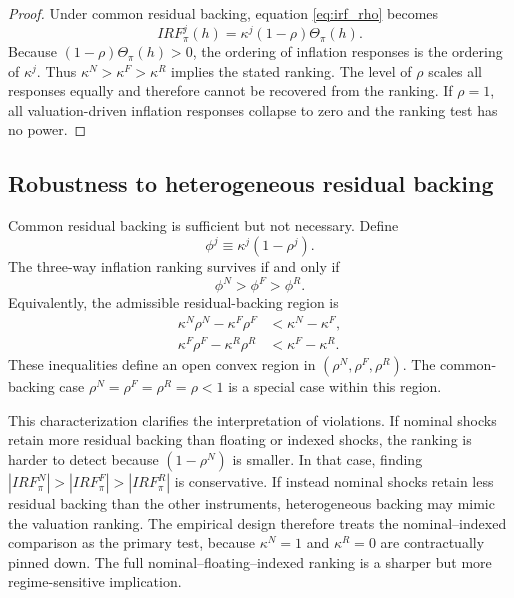 \documentclass[12pt,a4paper]{article}
\begin{document}
\begin{proof}
Under common residual backing, equation \eqref{eq:irf_rho} becomes
\[
IRF_{\pi}^{j}(h)=\kappa^j(1-\rho)\Theta_{\pi}(h).
\]
Because \((1-\rho)\Theta_{\pi}(h)>0\), the ordering of inflation responses is the ordering of \(\kappa^j\). Thus \(\kappa^N>\kappa^F>\kappa^R\) implies the stated ranking. The level of \(\rho\) scales all responses equally and therefore cannot be recovered from the ranking. If \(\rho=1\), all valuation-driven inflation responses collapse to zero and the ranking test has no power.\end{proof}

\subsection{Robustness to heterogeneous residual backing}

Common residual backing is sufficient but not necessary. Define
\begin{equation}
\phi^j \equiv \kappa^j(1-\rho^j).
\end{equation}
The three-way inflation ranking survives if and only if
\begin{equation}
\phi^N>\phi^F>\phi^R.
\end{equation}
Equivalently, the admissible residual-backing region is
\begin{align}
\kappa^N\rho^N-\kappa^F\rho^F &< \kappa^N-\kappa^F,
\label{eq:region_nf}\\
\kappa^F\rho^F-\kappa^R\rho^R &< \kappa^F-\kappa^R.
\label{eq:region_fr}
\end{align}
These inequalities define an open convex region in \((\rho^N,\rho^F,\rho^R)\). The common-backing case \(\rho^N=\rho^F=\rho^R=\rho<1\) is a special case within this region.

This characterization clarifies the interpretation of violations. If nominal shocks retain more residual backing than floating or indexed shocks, the ranking is harder to detect because \((1-\rho^N)\) is smaller. In that case, finding \(|IRF_{\pi}^{N}|>|IRF_{\pi}^{F}|>|IRF_{\pi}^{R}|\) is conservative. If instead nominal shocks retain less residual backing than the other instruments, heterogeneous backing may mimic the valuation ranking. The empirical design therefore treats the nominal--indexed comparison as the primary test, because \(\kappa^N=1\) and \(\kappa^R=0\) are contractually pinned down. The full nominal--floating--indexed ranking is a sharper but more regime-sensitive implication.
\end{document}

